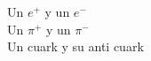 \documentclass[preview]{standalone}
\begin{document}
\begin{center}
Un $e^+$ y un $e^-$\\Un $\pi^+$ y un $\pi^-$\\Un cuark y su anti cuark
\end{center}
\end{document}
